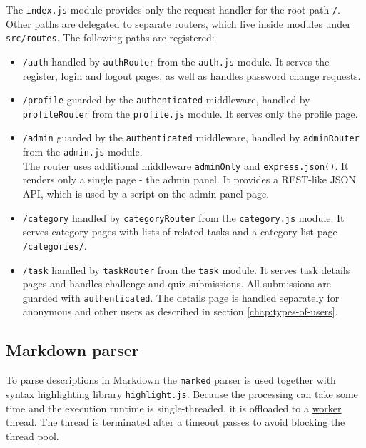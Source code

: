 The \texttt{index.js} module provides only the request handler for the root path \texttt{/}. Other paths are delegated to separate routers, which live inside modules under \texttt{src/routes}. The following paths are registered:

\begin{itemize}
    \item \texttt{/auth} handled by \texttt{authRouter} from the \texttt{auth.js} module. It serves the register, login and logout pages, as well as handles password change requests.
    \item \texttt{/profile} guarded by the \texttt{authenticated} middleware, handled by \texttt{profileRouter} from the \texttt{profile.js} module. It serves only the profile page.
    \item \texttt{/admin} guarded by the \texttt{authenticated} middleware, handled by \texttt{adminRouter} from the \texttt{admin.js} module.\\
    The router uses additional middleware \texttt{adminOnly} and \texttt{express.json()}. It renders only a single page - the admin panel. It provides a REST-like JSON API, which is used by a script on the admin panel page.
    \item \texttt{/category} handled by \texttt{categoryRouter} from the \texttt{category.js} module. It serves category pages with lists of related tasks and a category list page \texttt{/categories/}.
    \item \texttt{/task} handled by \texttt{taskRouter} from the \texttt{task} module. It serves task details pages and handles challenge and quiz submissions. All submissions are guarded with \texttt{authenticated}. The details page is handled separately for anonymous and other users as described in section \ref{chap:types-of-users}.
\end{itemize}

\subsection{Markdown parser}

To parse descriptions in Markdown the \href{https://marked.js.org/}{\texttt{marked}} parser is used together with syntax highlighting library \href{https://highlightjs.org/}{\texttt{highlight.js}}. Because the processing can take some time and the execution runtime is single-threaded, it is offloaded to a \href{https://nodejs.org/dist/latest-v19.x/docs/api/worker_threads.html}{worker thread}. The thread is terminated after a timeout passes to avoid blocking the thread pool. \cite{bib:event-loop-explained,bib:event-loop-blocking}

